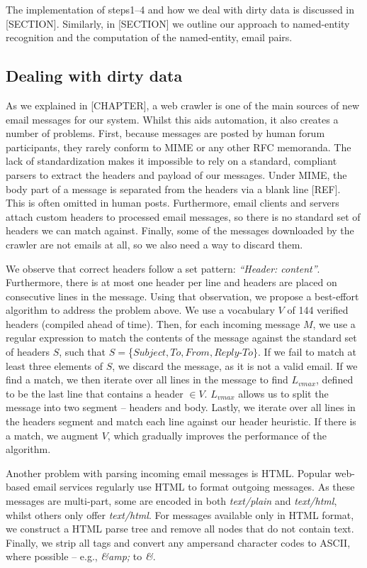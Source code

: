 The implementation of steps1--4 and how we deal with dirty data is discussed in [SECTION]. Similarly, in [SECTION] we outline our approach to named-entity recognition and the computation of the named-entity, email pairs.

\subsection{Dealing with dirty data}
As we explained in [CHAPTER], a web crawler is one of the main sources of new email messages for our system. Whilst this aids automation, it also creates a number of problems. First, because messages are posted by human forum participants, they rarely conform to MIME or any other RFC memoranda. The lack of standardization makes it impossible to rely on a standard, compliant parsers to extract the headers and payload of our messages. Under MIME, the body part of a message is separated from the headers via a blank line [REF]. This is often omitted in human posts. Furthermore, email clients and servers attach custom headers to processed email messages, so there is no standard set of headers we can match against. Finally, some of the messages downloaded by the crawler are not emails at all, so we also need a way to discard them.

We observe that correct headers follow a set pattern: \textit{``Header: content''}. Furthermore, there is at most one header per line and headers are placed on consecutive lines in the message. Using that observation, we propose a best-effort algorithm to address the problem above. We use a vocabulary $V$ of 144 verified headers (compiled ahead of time). Then, for each incoming message $M$, we use a regular expression to match the contents of the message against the standard set of headers $S$, such that $S = $\{$Subject, To, From, Reply$-$To\}$. If we fail to match at least three elements of $S$, we discard the message, as it is not a valid email. If we find a match, we then iterate over all lines in the message to find $L_{vmax}$, defined to be the last line that contains a header $\in V$. $L_{vmax}$ allows us to split the message into two segment -- headers and body. Lastly, we iterate over all lines in the headers segment and match each line against our header heuristic. If there is a match, we augment $V$, which gradually improves the performance of the algorithm.

Another problem with parsing incoming email messages is HTML. Popular web-based email services regularly use HTML to format outgoing messages. As these messages are multi-part, some are encoded in both \emph{text/plain} and \emph{text/html}, whilst others only offer \emph{text/html}. For messages available only in HTML format, we construct a HTML parse tree and remove all nodes that do not contain text. Finally, we strip all tags and convert any ampersand character codes to ASCII, where possible -- e.g.,  \emph{\&amp;} to \emph{\&}.

